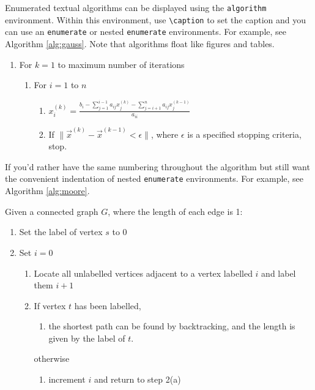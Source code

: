 \documentclass{article}
\begin{document}
Enumerated textual algorithms can be displayed using the
\texttt{algorithm} environment. Within this environment, use
\verb|\caption| to set the caption and you can use an
\texttt{enumerate} or nested \texttt{enumerate} environments.
For example, see Algorithm \ref{alg:gauss}. Note that algorithms
float like figures and tables.

\begin{algorithm}[htbp]
{ %
  {\caption{The Gauss-Seidel Algorithm}\label{alg:gauss}}%
{%
\begin{enumerate}
  \item For $k=1$ to maximum number of iterations
    \begin{enumerate}
      \item For $i=1$ to $n$
        \begin{enumerate}
        \item $x_i^{(k)} = 
          \frac{b_i - \sum_{j=1}^{i-1}a_{ij}x_j^{(k)}
          - \sum_{j=i+1}^{n}a_{ij}x_j^{(k-1)}}{a_{ii}}$
        \item If $\|\vec{x}^{(k)}-\vec{x}^{(k-1)} < \epsilon\|$,
          where $\epsilon$ is a specified stopping criteria, stop.
      \end{enumerate}
    \end{enumerate}
\end{enumerate}}
}%
\end{algorithm}

If you'd rather have the same numbering throughout the algorithm
but still want the convenient indentation of nested 
\texttt{enumerate} environments. For example, see Algorithm \ref{alg:moore}.

\begin{algorithm}
  {\caption{Moore's Shortest Path} \label{alg:moore}}%
{%
Given a connected graph $G$, where the length of each edge is 1:
\begin{enumerate}
  \item Set the label of vertex $s$ to 0
  \item Set $i=0$
  \begin{enumerate}
    \item \label{step:locate}Locate all unlabelled vertices 
          adjacent to a vertex labelled $i$ and label them $i+1$
    \item If vertex $t$ has been labelled,
    \begin{enumerate}
      \item[] the shortest path can be found by backtracking, and 
      the length is given by the label of $t$.
    \end{enumerate}
    otherwise
    \begin{enumerate}
      \item[] increment $i$ and return to step 2(a)
    \end{enumerate}
  \end{enumerate}
\end{enumerate}
}%
\end{algorithm}
\end{document}
